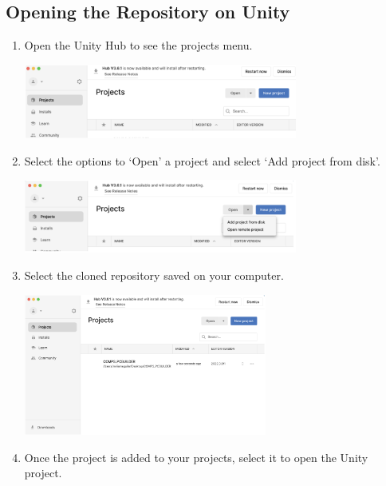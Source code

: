 \documentclass[10pt,twocolumn]{article}
\begin{document}
\subsection{Opening the Repository on Unity} 
\begin{enumerate}
    \item Open the Unity Hub to see the projects menu. 

    \begin{center}
        \includegraphics[width=9cm]{replication images/ProjectWindow.png}
    \end{center}

    \item Select the options to ‘Open’ a project and select ‘Add project from disk’.

    \begin{center}
        \includegraphics[width=9cm]{replication images/AddProject.png}
    \end{center}

    \item Select the cloned repository saved on your computer. 

    \begin{center}
        \includegraphics[width=8cm]{replication images/ProjectAdded.png}
    \end{center}

    \item Once the project is added to your projects, select it to open the Unity project. 
    
\end{enumerate}
\end{document}
